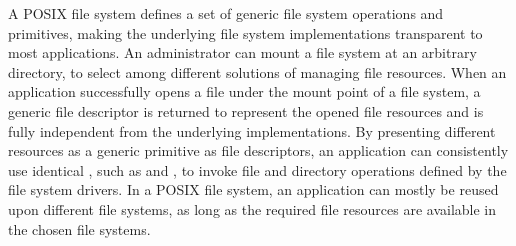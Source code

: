 A POSIX file system defines a set of generic file system operations and primitives, making the underlying file system implementations
transparent to most applications.
An administrator can mount a file system at an arbitrary directory, to select among different solutions of managing file resources.
When an application successfully opens a file
under the mount point of a file system,
a generic file descriptor is returned to represent the opened file resources
and is fully independent from the underlying implementations.
By presenting different resources as a generic primitive
as file descriptors,
an application can consistently use identical \linuxapis{},
such as  and , to invoke file and directory operations
defined by the file system drivers.
In a POSIX file system, an application can mostly be reused
upon different file systems, as long as the required file resources are available in the chosen file systems.













